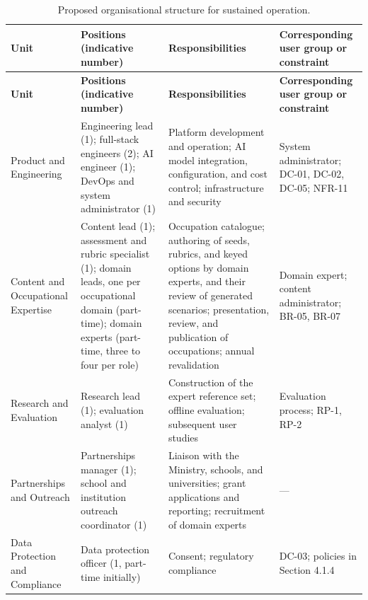{\small{}\renewcommand{\arraystretch}{1.1}
\begin{longtable}{|>{\raggedright\arraybackslash}p{}|>{\raggedright\arraybackslash}p{}|>{\raggedright\arraybackslash}p{}|>{\raggedright\arraybackslash}p{}|}
\caption{Proposed organisational structure for sustained operation.} \\
\hline
\textbf{Unit} & \textbf{Positions (indicative number)} & \textbf{Responsibilities} & \textbf{Corresponding user group or constraint} \\ \hline
\endfirsthead
\hline
\textbf{Unit} & \textbf{Positions (indicative number)} & \textbf{Responsibilities} & \textbf{Corresponding user group or constraint} \\ \hline
\endhead
Product and Engineering & Engineering lead (1); full-stack engineers (2); AI engineer (1); DevOps and system administrator (1) & Platform development and operation; AI model integration, configuration, and cost control; infrastructure and security & System administrator; DC-01, DC-02, DC-05; NFR-11 \\ \hline
Content and Occupational Expertise & Content lead (1); assessment and rubric specialist (1); domain leads, one per occupational domain (part-\allowbreak{}time); domain experts (part-time, three to four per role) & Occupation catalogue; authoring of seeds, rubrics, and keyed options by domain experts, and their review of generated scenarios; presentation, review, and publication of occupations; annual revalidation & Domain expert; content administrator; BR-05, BR-07 \\ \hline
Research and Evaluation & Research lead (1); evaluation analyst (1) & Construction of the expert reference set; offline evaluation; subsequent user studies & Evaluation process; RP-1, RP-2 \\ \hline
Partnerships and Outreach & Partnerships manager (1); school and institution outreach coordinator (1) & Liaison with the Ministry, schools, and universities; grant applications and reporting; recruitment of domain experts & --- \\ \hline
Data Protection and Compliance & Data protection officer (1, part-time initially) & Consent; regulatory compliance & DC-03; policies in Section 4.1.4 \\ \hline
\end{longtable}
}


